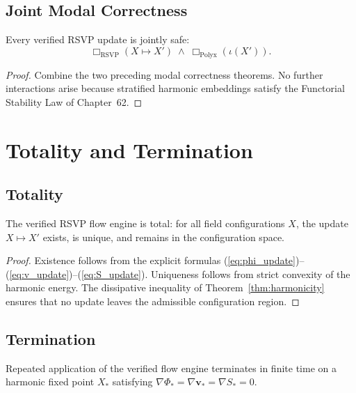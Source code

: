 \subsection{Joint Modal Correctness}

\begin{theorem}
\label{thm:joint_safety}
Every verified RSVP update is jointly safe:
\[
\Box_{\mathrm{RSVP}}(X\mapsto X')
\;\wedge\;
\Box_{\mathrm{Polyx}}(\iota(X')).
\]
\end{theorem}

\begin{proof}
Combine the two preceding modal correctness theorems.  
No further interactions arise because stratified harmonic embeddings satisfy the
Functorial Stability Law of Chapter~62.
\end{proof}

\section{Totality and Termination}

\subsection{Totality}

\begin{theorem}[Totality]
\label{thm:totality}
The verified RSV​P flow engine is total:
for all field configurations $X$,
the update $X\mapsto X'$ exists, is unique, and remains in the configuration
space.
\end{theorem}

\begin{proof}
Existence follows from the explicit formulas
(\ref{eq:phi_update})–(\ref{eq:v_update})–(\ref{eq:S_update}).  
Uniqueness follows from strict convexity of the harmonic energy.  
The dissipative inequality of Theorem~\ref{thm:harmonicity} ensures that no
update leaves the admissible configuration region.
\end{proof}

\subsection{Termination}

\begin{theorem}
\label{thm:termination}
Repeated application of the verified flow engine terminates in finite time on a
harmonic fixed point $X_\ast$ satisfying $\nabla\Phi_\ast=\nabla\mathbf{v}_\ast
=\nabla S_\ast=0$.
\end{theorem}

